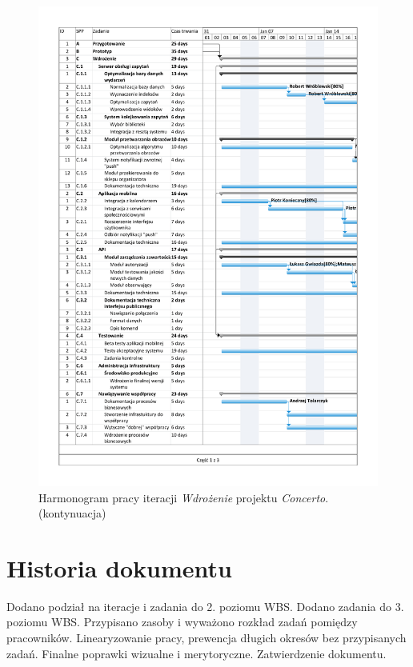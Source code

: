 \documentclass[10pt]{dokument-ppi}
\begin{document}
\begin{figure}[p]
    \ContinuedFloat
    \includegraphics[trim=1.2cm 1.2cm 1.2cm 1.2cm, page=3, width=\textwidth]{./figury/organizacja-pracy-C-wdrozenie}
    \caption[]{Harmonogram pracy iteracji \emph{Wdrożenie} projektu \emph{Concerto}. (kontynuacja)}
\end{figure}


\section{Historia dokumentu}
\begin{versions}
        Dodano podział na iteracje i zadania do 2. poziomu WBS.
        Dodano zadania do 3. poziomu WBS.
        Przypisano zasoby i wyważono rozkład zadań pomiędzy pracowników.
        Linearyzowanie pracy, prewencja długich okresów bez przypisanych zadań.
        Finalne poprawki wizualne i merytoryczne.
        Zatwierdzenie dokumentu.
\end{versions}
\end{document}
